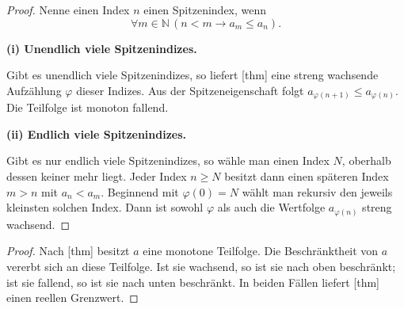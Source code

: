 \documentclass[main.tex]{subfiles}
\begin{document}
\begin{proof}
Nenne einen Index \(n\) einen Spitzenindex, wenn
\[
  \forall m\in\mathbb N\,(n<m\rightarrow a_m\leq a_n).
\]
\par\medskip\noindent\textbf{(i) Unendlich viele Spitzenindizes.}\par
Gibt es unendlich viele Spitzenindizes, so liefert
[thm] eine streng
wachsende Aufzählung \(\varphi\) dieser Indizes. Aus der Spitzeneigenschaft
folgt
\(a_{\varphi(n+1)}\leq a_{\varphi(n)}\). Die Teilfolge ist monoton
fallend.

\par\medskip\noindent\textbf{(ii) Endlich viele Spitzenindizes.}\par
Gibt es nur endlich viele Spitzenindizes, so wähle man einen Index
\(N\), oberhalb dessen keiner mehr liegt. Jeder Index \(n\geq N\) besitzt
dann einen späteren Index \(m>n\) mit \(a_n<a_m\). Beginnend mit
\(\varphi(0)=N\) wählt man rekursiv den jeweils kleinsten solchen Index.
Dann ist sowohl \(\varphi\) als auch die Wertfolge
\(a_{\varphi(n)}\) streng wachsend.
\end{proof}

\begin{proof}
Nach [thm] besitzt \(a\) eine
monotone Teilfolge. Die Beschränktheit von \(a\) vererbt sich an diese
Teilfolge. Ist sie wachsend, so ist sie nach oben beschränkt; ist sie
fallend, so ist sie nach unten beschränkt. In beiden Fällen liefert
[thm] einen reellen Grenzwert.
\end{proof}
\end{document}

